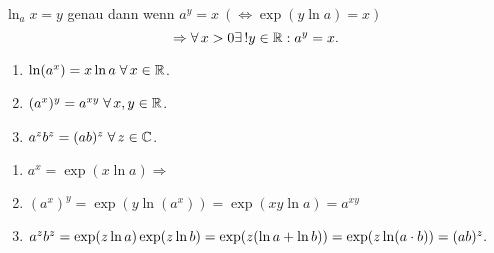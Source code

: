 \documentclass[../ana2.tex]{subfiles}
\begin{document}
\begin{defi}
    \( \ln_a x = y \) genau dann wenn 
    \( a^y = x \ (\Leftrightarrow \exp(y\ln a) = x) \)
    \[ \Rightarrow \forall x > 0 \existse y \in \R: a^y = x. \]
\end{defi}
\begin{satz}\leavevmode
    \begin{enumerate}
        \item \( \ln (a^x) = x \ln a \;\forall x \in \R \).
        \item \( (a^x)^y = a^{xy} \;\forall x,y \in \R \).
        \item \( a^z b^z = (ab)^z \;\forall z\in\C \).
    \end{enumerate}
\end{satz}
\begin{bew}\leavevmode
    \begin{enumerate}
        \item \( a^x = \exp(x\ln a) \Rightarrow \)
        \item \( (a^x)^y = \exp(y\ln (a^x)) = \exp (xy \ln a)
        =a^{xy} \)
        \item \( a^z b^z = \exp(z \ln a) \exp(z \ln b) \\
        = \exp(z (\ln a + \ln b)) = \exp(z \ln(a\cdot b)) 
        = (ab)^z. \)
    \end{enumerate}
\end{bew}
\end{document}
